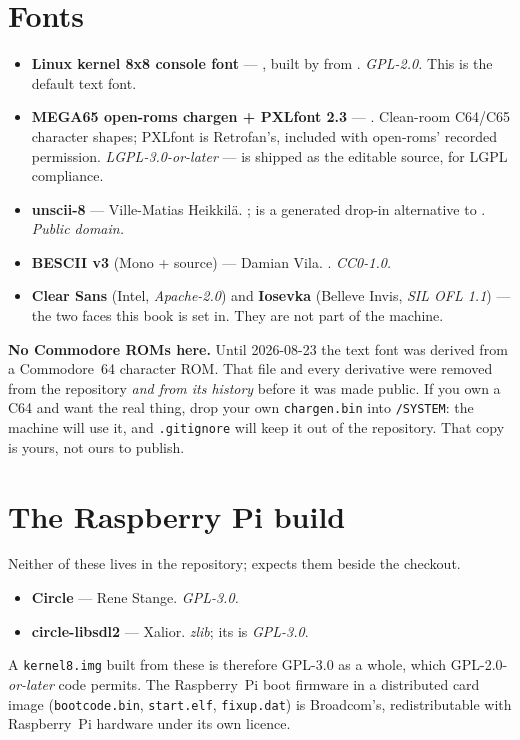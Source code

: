 \section{Fonts}
\begin{itemize}[leftmargin=1.4em]
\item \textbf{Linux kernel 8x8 console font} --- ,
  built by  from .
  \emph{GPL-2.0.} This is the default text font.
\item \textbf{MEGA65 open-roms chargen + PXLfont 2.3} ---
  . Clean-room C64/C65 character shapes;
  PXLfont is Retrofan's, included with open-roms' recorded permission.
  \emph{LGPL-3.0-or-later} ---  is shipped as the
  editable source, for LGPL compliance.
\item \textbf{unscii-8} --- Ville-Matias Heikkilä.
  ;  is a generated
  drop-in alternative to . \emph{Public domain.}
\item \textbf{BESCII v3} (Mono + source) --- Damian Vila.
  . \emph{CC0-1.0.}
\item \textbf{Clear Sans} (Intel, \emph{Apache-2.0}) and
  \textbf{Iosevka} (Belleve Invis, \emph{SIL OFL 1.1}) --- the two
  faces this book is set in. They are not part of the machine.
\end{itemize}

\begin{aside}
\textbf{No Commodore ROMs here.} Until 2026-08-23 the text font was
derived from a Commodore~64 character ROM. That file and every
derivative were removed from the repository \emph{and from its
history} before it was made public. If you own a C64 and want the real
thing, drop your own \verb|chargen.bin| into \verb|/SYSTEM|: the
machine will use it, and \verb|.gitignore| will keep it out of the
repository. That copy is yours, not ours to publish.
\end{aside}

\section{The Raspberry Pi build}
Neither of these lives in the repository;  expects
them beside the checkout.
\begin{itemize}[leftmargin=1.4em]
\item \textbf{Circle} --- Rene Stange. \emph{GPL-3.0.}
\item \textbf{circle-libsdl2} --- Xalior. \emph{zlib}; its
   is \emph{GPL-3.0}.
\end{itemize}
A \verb|kernel8.img| built from these is therefore GPL-3.0 as a whole,
which GPL-2.0-\emph{or-later} code permits. The Raspberry~Pi boot
firmware in a distributed card image (\verb|bootcode.bin|,
\verb|start.elf|, \verb|fixup.dat|) is Broadcom's, redistributable
with Raspberry~Pi hardware under its own licence.

